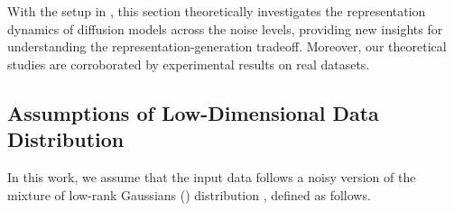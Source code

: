 



With the setup in , this section theoretically investigates the representation dynamics of diffusion models across the noise levels, providing new insights for understanding the representation-generation tradeoff. Moreover, our theoretical studies are corroborated by experimental results on real datasets.






\subsection{Assumptions of Low-Dimensional Data Distribution}\label{subsec:model}


In this work, we assume that the input data follows a noisy version of the mixture of low-rank Gaussians (\MoLRG) distribution \citep{wang2024diffusion,elhamifar2013sparse, wang2022convergence}, defined as follows.


